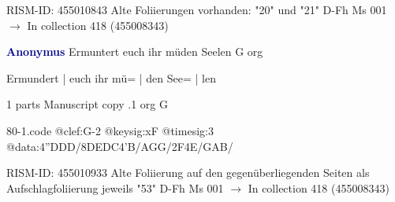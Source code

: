 \documentclass[twocolumn]{book}
\begin{document}
\newline RISM-ID: 455010843
\newline Alte Foliierungen vorhanden: "20" und "21"
\newline D-Fh  Ms 001
\newline $\rightarrow$ In collection 418 (455008343)

\newline \par \vspace{7pt} \textcolor{darkblue}{\textbf{Anonymus  }}
\newline Ermuntert euch ihr müden Seelen  G  
\newline org
\newline \begin{itshape}[f.62r, at left:] Ermundert | euch ihr mü= | den See= | len\end{itshape} 
\newline \textcolor{darkblue}{}  1 parts  
\newline Manuscript copy
.1  org  G  
\begin{filecontents*}{80-1.code}
@clef:G-2
@keysig:xF
@timesig:3
@data:4''DDD/{8DEDC}4'B/AGG/2F4E/GAB/
\end{filecontents*}
\newline
%

\newline RISM-ID: 455010933
\newline Alte Foliierung auf den gegenüberliegenden Seiten als Aufschlagfoliierung jeweils "53"
\newline D-Fh  Ms 001
\newline $\rightarrow$ In collection 418 (455008343)
\end{document}
